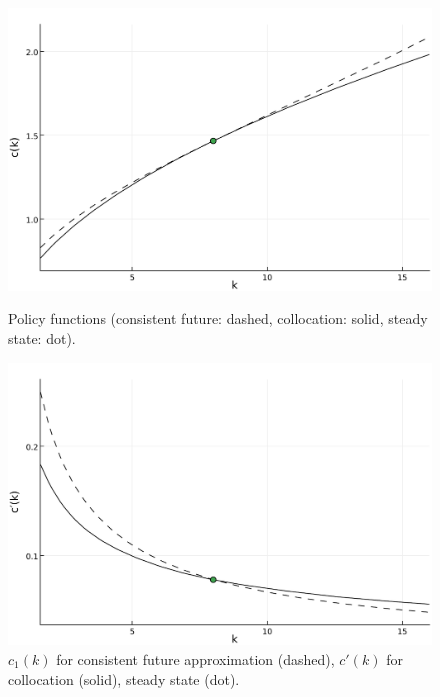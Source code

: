 \documentclass[a4paper,11pt]{article}
\newcommand{\figwidth}{\linewidth}
\begin{document}
\begin{figure}[b]
  \centering
  \begin{minipage}[t]{0.48\linewidth}
    \includegraphics[width=\figwidth]{../fig/ck.pdf}
    \caption{Policy functions (consistent future: dashed, collocation: solid, steady state: dot).}
    \label{fig:ck}
  \end{minipage}\hfill%
  \begin{minipage}[t]{0.48\linewidth}
    \includegraphics[width=\figwidth]{../fig/ckprime.pdf}
    \caption{$c_1(k)$ for consistent future approximation (dashed), $c'(k)$ for collocation (solid), steady state (dot).}
    \label{fig:ckprime}
  \end{minipage}
  \begin{minipage}[t]{0.48\linewidth}

\end{minipage}
\end{figure}
\end{document}
